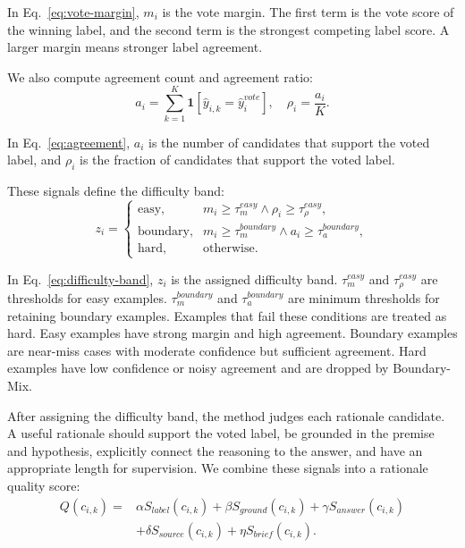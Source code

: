 In Eq.~\eqref{eq:vote-margin}, $m_i$ is the vote margin. The first term is the vote score of the winning label, and the second term is the strongest competing label score. A larger margin means stronger label agreement.

We also compute agreement count and agreement ratio:
\begin{equation}
    a_i = \sum_{k=1}^{K} \mathbf{1}[\hat{y}_{i,k} = \hat{y}^{vote}_i],
    \quad
    \rho_i = \frac{a_i}{K}.
    \label{eq:agreement}
\end{equation}

In Eq.~\eqref{eq:agreement}, $a_i$ is the number of candidates that support the voted label, and $\rho_i$ is the fraction of candidates that support the voted label.

These signals define the difficulty band:
\begin{equation}
    z_i =
    \begin{cases}
        \text{easy}, & m_i \ge \tau_m^{easy} \land \rho_i \ge \tau_\rho^{easy}, \\
        \text{boundary}, & m_i \ge \tau_m^{boundary} \land a_i \ge \tau_a^{boundary}, \\
        \text{hard}, & \text{otherwise}.
    \end{cases}
    \label{eq:difficulty-band}
\end{equation}

In Eq.~\eqref{eq:difficulty-band}, $z_i$ is the assigned difficulty band. $\tau_m^{easy}$ and $\tau_\rho^{easy}$ are thresholds for easy examples. $\tau_m^{boundary}$ and $\tau_a^{boundary}$ are minimum thresholds for retaining boundary examples. Examples that fail these conditions are treated as hard. Easy examples have strong margin and high agreement. Boundary examples are near-miss cases with moderate confidence but sufficient agreement. Hard examples have low confidence or noisy agreement and are dropped by Boundary-Mix.

After assigning the difficulty band, the method judges each rationale candidate. A useful rationale should support the voted label, be grounded in the premise and hypothesis, explicitly connect the reasoning to the answer, and have an appropriate length for supervision. We combine these signals into a rationale quality score:
\begin{equation}
\begin{aligned}
    Q(c_{i,k}) =
    &\alpha S_{label}(c_{i,k})
    + \beta S_{ground}(c_{i,k})
    + \gamma S_{answer}(c_{i,k}) \\
    &+ \delta S_{source}(c_{i,k})
    + \eta S_{brief}(c_{i,k}).
\end{aligned}
    \label{eq:rationale-quality}
\end{equation}

